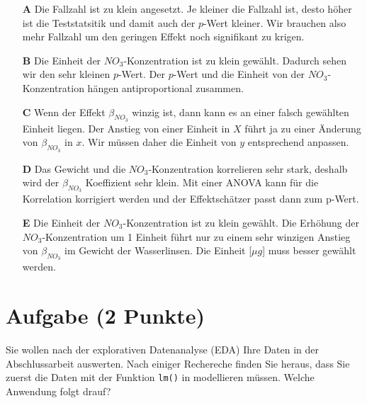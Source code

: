 \documentclass[a4paper, 9pt]{scrartcl}\usepackage[]{graphicx}\usepackage[]{xcolor}
\begin{document}
\begin{enumerate}
\item [\textbf{A} \msquare] Die Fallzahl ist zu klein angesetzt. Je kleiner die Fallzahl ist, desto höher ist die Teststatsitik und damit auch der $p$-Wert kleiner. Wir brauchen also mehr Fallzahl um den geringen Effekt noch signifikant zu krigen.
\item [\textbf{B} \msquare] Die Einheit der $NO_3$-Konzentration ist zu klein gewählt. Dadurch sehen wir den sehr kleinen $p$-Wert. Der $p$-Wert und die Einheit von der $NO_3$-Konzentration hängen antiproportional zusammen.
\item [\textbf{C} \msquare] Wenn der Effekt $\beta_{NO_3}$ winzig ist, dann kann es an einer falsch gewählten Einheit liegen. Der Anstieg von einer Einheit in $X$ führt ja zu einer Änderung von $\beta_{NO_3}$ in $x$. Wir müssen daher die Einheit von $y$ entsprechend anpassen.
\item [\textbf{D} \msquare] Das Gewicht und die $NO_3$-Konzentration korrelieren sehr stark, deshalb wird der $\beta_{NO_3}$ Koeffizient sehr klein. Mit einer ANOVA kann für die Korrelation korrigiert werden und der Effektschätzer passt dann zum p-Wert.
\item [\textbf{E} \msquare] Die Einheit der $NO_3$-Konzentration ist zu klein gewählt. Die Erhöhung der $NO_3$-Konzentration um 1 Einheit führt nur zu einem sehr winzigen Anstieg von $\beta_{NO_3}$ im Gewicht der Wasserlinsen. Die Einheit [$\mu g$] muss besser gewählt werden.
\end{enumerate}

\section{Aufgabe \hfill (2 Punkte)}



Sie wollen nach der explorativen Datenanalyse (EDA) Ihre Daten in der Abschlussarbeit auswerten. Nach einiger Rechereche finden Sie heraus, dass Sie zuerst die Daten mit der Funktion \texttt{lm()} in \Rlogo modellieren müssen. Welche Anwendung folgt drauf?
\end{document}
